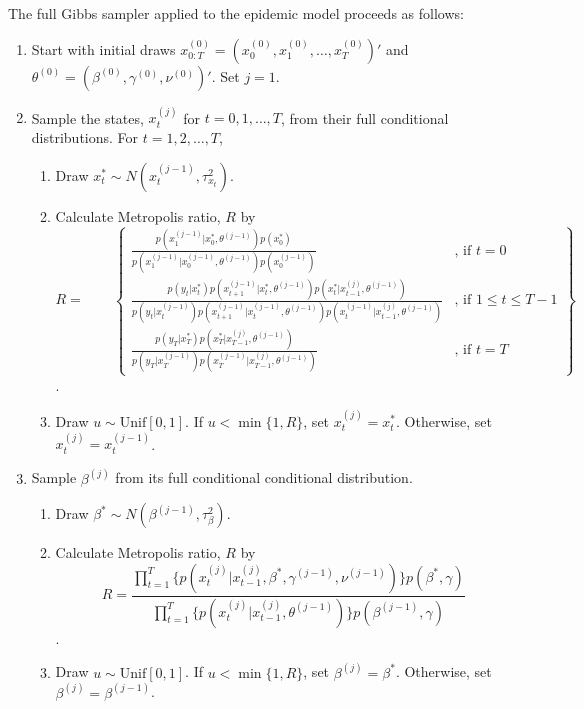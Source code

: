 The full Gibbs sampler applied to the epidemic model proceeds as follows:
\begin{enumerate}
\item Start with initial draws $x^{(0)}_{0:T} = (x^{(0)}_0, x^{(0)}_1, \ldots, x^{(0)}_T)'$ and $\theta^{(0)} = (\beta^{(0)}, \gamma^{(0)}, \nu^{(0)})'$. Set $j = 1$.
\item \label{step:gibbs} Sample the states, $x^{(j)}_t$ for $t = 0,1,\ldots,T$, from their full conditional distributions. For $t = 1, 2, \ldots, T$,
    \begin{enumerate}[label=\alph*.,leftmargin=1.75\parindent]
    \item Draw $x^*_t \sim N(x^{(j-1)}_t,\tau^2_{x_t})$.
    \item Calculate Metropolis ratio, $R$ by
    \[R = \qquad \left\{
    \begin{array}{cc}
    \frac{p(x^{(j-1)}_1|x^*_0,\theta^{(j-1)})p(x^*_0)}{p(x^{(j-1)}_1|x^{(j-1)}_0,\theta^{(j-1)})p(x^{(j-1)}_0)} & \mbox{, if } t = 0 \\
    \frac{p(y_t|x^*_t)p(x^{(j-1)}_{t+1}|x^*_t,\theta^{(j-1)})p(x^*_t|x^{(j)}_{t-1},\theta^{(j-1)})}{p(y_t|x^{(j-1)}_t)p(x^{(j-1)}_{t+1}|x^{(j-1)}_t,\theta^{(j-1)})p(x^{(j-1)}_t|x^{(j)}_{t-1},\theta^{(j-1)})} & \mbox{, if } 1 \le t \le T-1 \\
        \frac{p(y_T|x^*_T)p(x^*_T|x^{(j)}_{T-1},\theta^{(j-1)})}{p(y_T|x^{(j-1)}_T)p(x^{(j-1)}_T|x^{(j)}_{T-1},\theta^{(j-1)})}  & \mbox{, if } t = T
    \end{array}
    \right\}\].
    \item Draw $u \sim \mbox{Unif}[0,1]$. If $u < \min\{1, R\}$, set $x^{(j)}_t = x^*_t$. Otherwise, set $x^{(j)}_t = x^{(j-1)}_t$.
    \end{enumerate}
\item Sample $\beta^{(j)}$ from its full conditional conditional distribution.
    \begin{enumerate}[label=\alph*.,leftmargin=1.75\parindent]
    \item Draw $\beta^* \sim N(\beta^{(j-1)},\tau^2_{\beta})$.
    \item Calculate Metropolis ratio, $R$ by
    \[R = \frac{\prod_{t=1}^T \{p(x^{(j)}_t|x^{(j)}_{t-1},\beta^*,\gamma^{(j-1)},\nu^{(j-1)})\}p(\beta^*,\gamma)}{\prod_{t=1}^T \{p(x^{(j)}_t|x^{(j)}_{t-1},\theta^{(j-1)})\}p(\beta^{(j-1)},\gamma)}\].
    \item Draw $u \sim \mbox{Unif}[0,1]$. If $u < \min\{1, R\}$, set $\beta^{(j)} = \beta^*$. Otherwise, set $\beta^{(j)} = \beta^{(j-1)}$.

\end{enumerate}
\end{enumerate}
